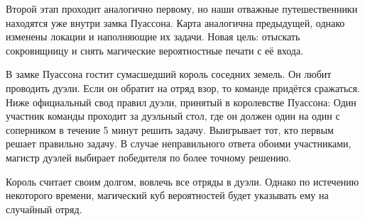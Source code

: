 \documentclass[a4paper,12pt]{article}
\begin{document}
Второй этап проходит аналогично первому, но наши отважные путешественники находятся уже внутри замка Пуассона. 
Карта аналогична предыдущей, однако изменены локации и наполняющие их задачи. 
Новая цель: отыскать сокровищницу и снять магические вероятностные печати с её входа.  

В замке Пуассона гостит сумасшедший король соседних земель. Он любит проводить дуэли. 
Если он обратит на отряд взор, то команде придётся сражаться. 
Ниже официальный свод правил дуэли, принятый в королевстве Пуассона: 
Один участник команды проходит за дуэльный стол, 
где он должен один на один с соперником в течение 5 минут решить задачу. 
Выигрывает тот, кто первым решает правильно задачу. 
В случае неправильного ответа обоими участниками, магистр дуэлей выбирает победителя по более точному решению.


Король считает своим долгом, вовлечь все отряды в дуэли. 
Однако по истечению некоторого времени, 
магический куб вероятностей будет указывать ему на случайный отряд.
\end{document}
